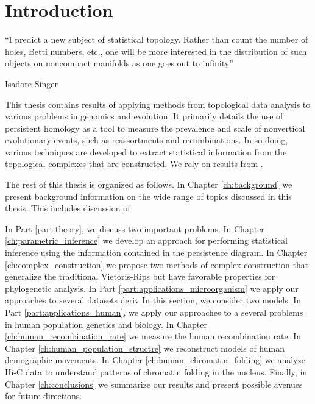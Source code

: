 \chapter{Introduction}
\label{ch:introduction}

\epigraph{``I predict a new subject of statistical topology. Rather than count the
number of holes, Betti numbers, etc., one will be more interested in the
distribution of such objects on noncompact manifolds as one goes out
to infinity''}{Isadore Singer}

This thesis contains results of applying methods from topological data analysis to various problems in genomics and evolution.
It primarily details the use of persistent homology as a tool to measure the prevalence and scale of nonvertical evolutionary events, such as reassortments and recombinations.
In so doing, various techniques are developed to extract statistical information from the topological complexes that are constructed.
We rely on results from \cite{Grosz_and_Sidner_1986}.

The rest of this thesis is organized as follows.
In Chapter \ref{ch:background} we present background information on the wide range of topics discussed in this thesis.
This includes discussion of 

In Part \ref{part:theory}, we discuss two important problems.
In Chapter \ref{ch:parametric_inference} we develop an approach for performing statistical inference using the information contained in the persistence diagram.
In Chapter \ref{ch:complex_construction} we propose two methods of complex construction that generalize the traditional Vietoris-Rips but have favorable properties for phylogenetic analysis.
In Part \ref{part:applications_microorganism} we apply our approaches to several datasets deriv
In this section, we consider two models.
In Part \ref{part:applications_human}, we apply our approaches to a several problems in human population genetics and biology.
In Chapter \ref{ch:human_recombination_rate} we measure the human recombination rate.
In Chapter \ref{ch:human_population_structre} we reconstruct models of human demographic movements.
In Chapter \ref{ch:human_chromatin_folding} we analyze Hi-C data to understand patterns of chromatin folding in the nucleus.
Finally, in Chapter \ref{ch:conclusions} we summarize our results and present possible avenues for future directions.